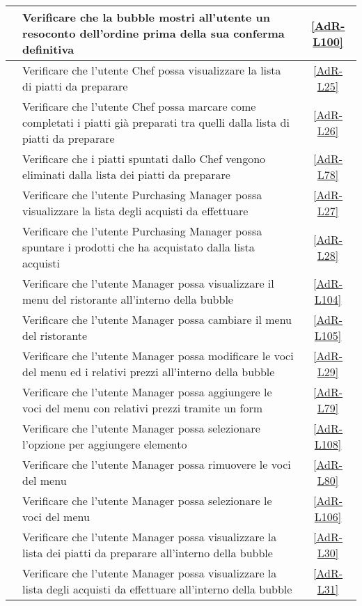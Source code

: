 \begin{longtable}{|c|P{9cm}|c|}
	\hline {} & Verificare che la bubble mostri all'utente un resoconto dell'ordine prima della sua conferma definitiva & \ref{AdR-L100} \\
	\hline {} & Verificare che l'utente Chef possa visualizzare la lista di piatti da preparare & \ref{AdR-L25} \\
	\hline {} & Verificare che l'utente Chef possa marcare come completati i piatti già preparati tra quelli dalla lista di piatti da preparare  & \ref{AdR-L26} \\
	\hline {} & Verificare che i piatti spuntati dallo Chef vengono eliminati dalla lista dei piatti da preparare & \ref{AdR-L78} \\
	\hline {} & Verificare che l'utente Purchasing Manager possa visualizzare la lista degli acquisti da effettuare & \ref{AdR-L27} \\
	\hline {} & Verificare che l'utente Purchasing Manager possa spuntare i prodotti che ha acquistato dalla lista acquisti & \ref{AdR-L28} \\
	\hline {} & Verificare che l'utente Manager possa visualizzare il menu del ristorante all’interno della bubble & \ref{AdR-L104}  \\
	\hline {} & Verificare che l'utente Manager possa cambiare il menu del ristorante & \ref{AdR-L105} \\
	\hline {} & Verificare che l'utente Manager possa modificare le voci del menu ed i relativi prezzi all’interno della bubble & \ref{AdR-L29} \\
	\hline {} & Verificare che l'utente Manager possa aggiungere le voci del menu con relativi prezzi tramite un form & \ref{AdR-L79} \\
	\hline {} & Verificare che l'utente Manager possa selezionare l'opzione per aggiungere elemento & \ref{AdR-L108} \\
	\hline {} & Verificare che l'utente Manager possa rimuovere le voci del menu & \ref{AdR-L80} \\
	\hline {} & Verificare che l'utente Manager possa selezionare le voci del menu & \ref{AdR-L106} \\
	\hline {} & Verificare che l'utente Manager possa visualizzare la lista dei piatti da preparare all’interno della bubble & \ref{AdR-L30} \\
	\hline {} & Verificare che l'utente Manager possa visualizzare la lista degli acquisti da effettuare all’interno della bubble & \ref{AdR-L31} \\

\end{longtable}
